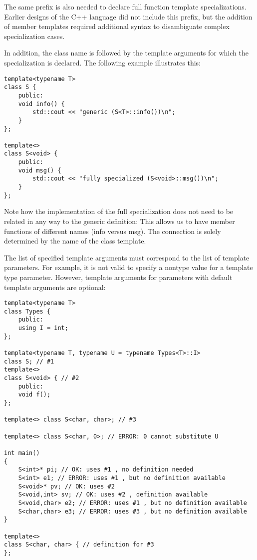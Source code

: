\begin{tcolorbox}[colback=webgreen!5!white,colframe=webgreen!75!black]
\hspace*{0.75cm}The same prefix is also needed to declare full function template specializations. Earlier designs of the C++ language did not include this prefix, but the addition of member templates required additional syntax to disambiguate complex specialization cases.
\end{tcolorbox}

In addition, the class name is followed by the template arguments for which the specialization is declared. The following example illustrates this:

\begin{lstlisting}[style=styleCXX]
template<typename T>
class S {
	public:
	void info() {
		std::cout << "generic (S<T>::info())\n";
	}
};

template<>
class S<void> {
	public:
	void msg() {
		std::cout << "fully specialized (S<void>::msg())\n";
	}
};
\end{lstlisting}

Note how the implementation of the full specialization does not need to be related in any way to the generic definition: This allows us to have member functions of different names (info versus msg). The connection is solely determined by the name of the class template.

The list of specified template arguments must correspond to the list of template parameters. For example, it is not valid to specify a nontype value for a template type parameter. However, template arguments for parameters with default template arguments are optional:

\begin{lstlisting}[style=styleCXX]
template<typename T>
class Types {
	public:
	using I = int;
};

template<typename T, typename U = typename Types<T>::I>
class S; // #1
template<>
class S<void> { // #2
	public:
	void f();
};

template<> class S<char, char>; // #3

template<> class S<char, 0>; // ERROR: 0 cannot substitute U

int main()
{
	S<int>* pi; // OK: uses #1 , no definition needed
	S<int> e1; // ERROR: uses #1 , but no definition available
	S<void>* pv; // OK: uses #2
	S<void,int> sv; // OK: uses #2 , definition available
	S<void,char> e2; // ERROR: uses #1 , but no definition available
	S<char,char> e3; // ERROR: uses #3 , but no definition available
}

template<>
class S<char, char> { // definition for #3
};
\end{lstlisting}

